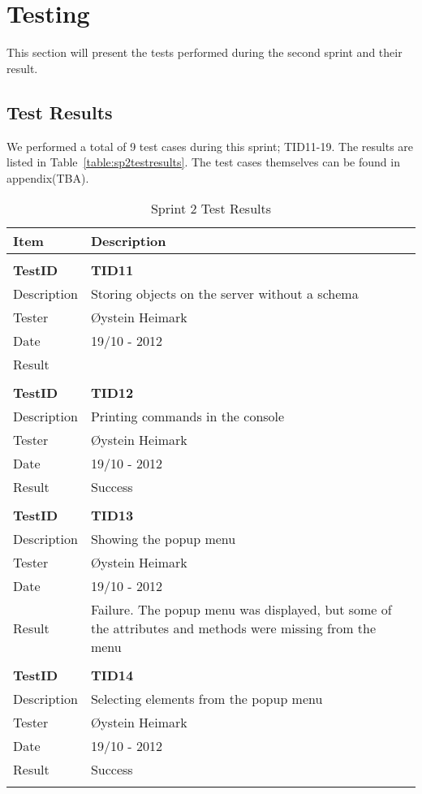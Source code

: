 \section{Testing}
This section will present the tests performed during the second sprint and their result.

\subsection{Test Results}
We performed a total of 9 test cases during this sprint; TID11-19. The results are listed in Table~\ref{table:sp2testresults}. The test cases themselves can be found in appendix(TBA).

\begin{table}
\caption{Sprint 2 Test Results}
\centering
\begin{tabular}{ l p{13cm} }

\hline 
Item			&Description		\\
\hline \\ [-2.0ex]

\bf{TestID}		&\bf{TID11}			\\
Description	&Storing objects on the server without a schema	\\
Tester		&Øystein Heimark	\\
Date			&19/10 - 2012	\\
Result		&				\\
\hline \\ [-2.0ex]

\bf{TestID}		&\bf{TID12}			\\
Description	&Printing commands in the console 	\\
Tester		&Øystein Heimark	\\
Date			&19/10 - 2012	\\
Result		&Success			\\
\hline \\ [-2.0ex]

\bf{TestID}		&\bf{TID13}			\\
Description	&Showing the popup menu	\\
Tester		&Øystein Heimark	\\
Date			&19/10 - 2012	\\
Result		&Failure. The popup menu was displayed, but some of the attributes and methods were missing from the menu				\\
\hline \\ [-2.0ex]

\bf{TestID}		&\bf{TID14}			\\
Description	&Selecting elements from the popup menu	\\
Tester		&Øystein Heimark	\\
Date			&19/10 - 2012	\\
Result		&Success			\\
\hline \\ [-2.0ex]


\end{tabular}
\end{table}
